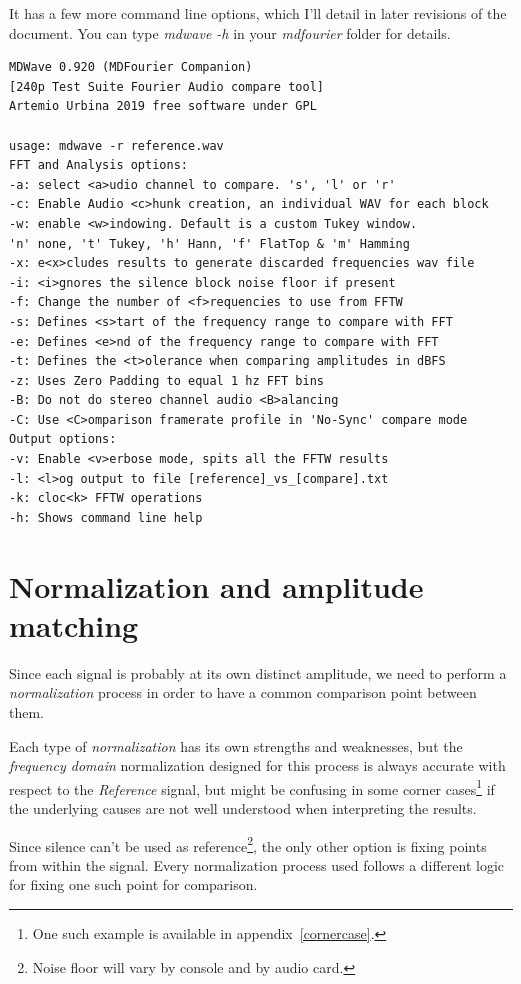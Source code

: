 \documentclass[10pt,a4paper]{report}
\begin{document}
\begin{appendices}
It has a few more command line options, which I'll detail in later revisions of the document. You can type \textit{mdwave -h} in your \textit{mdfourier} folder for details.

\begin{verbatim}
MDWave 0.920 (MDFourier Companion)
[240p Test Suite Fourier Audio compare tool]
Artemio Urbina 2019 free software under GPL

usage: mdwave -r reference.wav
FFT and Analysis options:
-a: select <a>udio channel to compare. 's', 'l' or 'r'
-c: Enable Audio <c>hunk creation, an individual WAV for each block
-w: enable <w>indowing. Default is a custom Tukey window.
'n' none, 't' Tukey, 'h' Hann, 'f' FlatTop & 'm' Hamming
-x: e<x>cludes results to generate discarded frequencies wav file
-i: <i>gnores the silence block noise floor if present
-f: Change the number of <f>requencies to use from FFTW
-s: Defines <s>tart of the frequency range to compare with FFT
-e: Defines <e>nd of the frequency range to compare with FFT
-t: Defines the <t>olerance when comparing amplitudes in dBFS
-z: Uses Zero Padding to equal 1 hz FFT bins
-B: Do not do stereo channel audio <B>alancing
-C: Use <C>omparison framerate profile in 'No-Sync' compare mode
Output options:
-v: Enable <v>erbose mode, spits all the FFTW results
-l: <l>og output to file [reference]_vs_[compare].txt
-k: cloc<k> FFTW operations
-h: Shows command line help
\end{verbatim}

\chapter{Normalization and amplitude matching}
\label{normalization}

Since each signal is probably at its own distinct amplitude, we need to perform a \textit{normalization} process in order to have a common comparison point between them.

Each type of \textit{normalization} has its own strengths and weaknesses, but the \textit{frequency domain} normalization designed for this process is always accurate with respect to the \textit{Reference} signal, but might be confusing in some corner cases\footnote{One such example is available in appendix~\ref{cornercase}.} if the underlying causes are not well understood when interpreting the results.

Since silence can't be used as reference\footnote{Noise floor will vary by console and by audio card.}, the only other option is fixing points from within the signal. Every normalization process used follows a different logic for fixing one such point for comparison.


\end{appendices}
\end{document}
